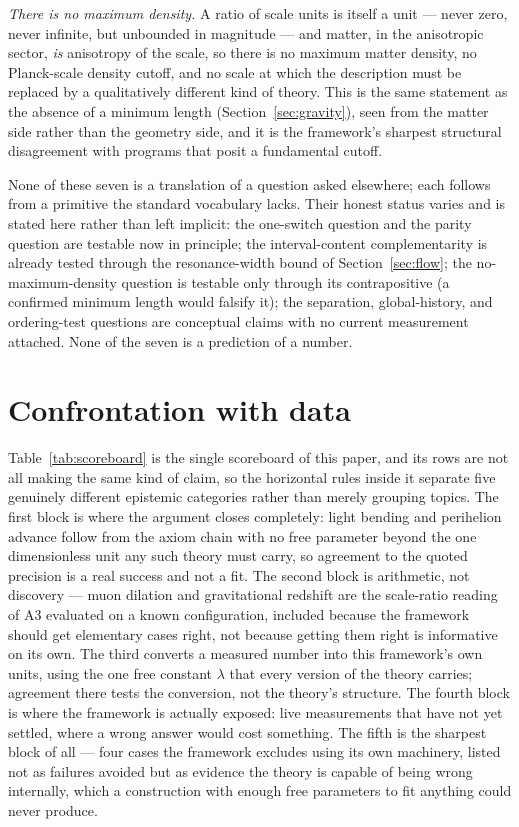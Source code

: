 \documentclass[aps,prd,twocolumn,superscriptaddress,nofootinbib]{revtex4-2}
\begin{document}
\emph{There is no maximum density.} A ratio of scale units is itself a
unit — never zero, never infinite, but unbounded in magnitude — and
matter, in the anisotropic sector, \emph{is} anisotropy of the scale, so
there is no maximum matter density, no Planck-scale density cutoff, and
no scale at which the description must be replaced by a qualitatively
different kind of theory. This is the same statement as the absence of a
minimum length (Section~\ref{sec:gravity}), seen from the matter side
rather than the geometry side, and it is the framework's sharpest
structural disagreement with programs that posit a fundamental cutoff.

None of these seven is a translation of a question asked elsewhere; each
follows from a primitive the standard vocabulary lacks. Their honest
status varies and is stated here rather than left implicit: the
one-switch question and the parity question are testable now in
principle; the interval-content complementarity is already tested
through the resonance-width bound of Section~\ref{sec:flow}; the
no-maximum-density question is testable only through its contrapositive
(a confirmed minimum length would falsify it); the separation, global-history,
and ordering-test questions are conceptual claims with no current
measurement attached. None of the seven is a prediction of a number.

\section{Confrontation with data}\label{sec:data}

Table~\ref{tab:scoreboard} is the single scoreboard of this paper, and
its rows are not all making the same kind of claim, so the horizontal
rules inside it separate five genuinely different epistemic categories
rather than merely grouping topics. The first block is where the
argument closes completely: light bending and perihelion advance follow
from the axiom chain with no free parameter beyond the one dimensionless
unit any such theory must carry, so agreement to the quoted precision is
a real success and not a fit. The second block is arithmetic, not
discovery — muon dilation and gravitational redshift are the scale-ratio
reading of A3 evaluated on a known configuration, included because the
framework should get elementary cases right, not because getting them
right is informative on its own. The third converts a measured number
into this framework's own units, using the one free constant $\lambda$
that every version of the theory carries; agreement there tests the
conversion, not the theory's structure. The fourth block is where the
framework is actually exposed: live measurements that have not yet
settled, where a wrong answer would cost something. The fifth is the
sharpest block of all — four cases the framework excludes using its own
machinery, listed not as failures avoided but as evidence the theory is
capable of being wrong internally, which a construction with enough free
parameters to fit anything could never produce.
\end{document}
